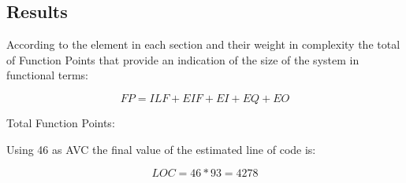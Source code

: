 
\subsection{Results} 
According to the element in each section and their weight in complexity the total of  Function Points that provide an indication of the size of the system in functional terms:

\begin{equation}
FP=ILF+EIF+EI+EQ+EO 
\end{equation}

Total Function Points: \textbf{}


Using 46 as AVC the final value of the estimated line of code is:

\begin{equation}
LOC = 46 * 93 = 4278
\end{equation}
